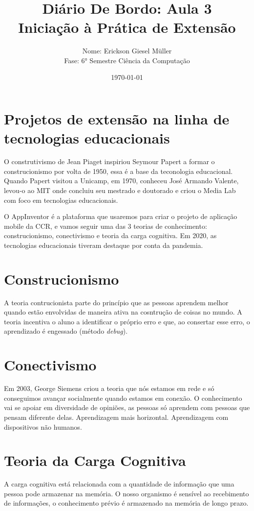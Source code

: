 \documentclass[12pt, a4paper]{article}
\title{Diário De Bordo: Aula 3\\Iniciação à Prática de Extensão}
\author{Nome: Erickson Giesel Müller
\\ Fase: 6° Semestre Ciência da Computação}
\date{\today}
\begin{document}
\maketitle
\thispagestyle{empty} %

\section*{Projetos de extensão na linha de tecnologias educacionais}
O construtivismo de Jean Piaget inspiriou Seymour Papert a formar o construcionismo por volta de 1950, essa é a base da teconologia educacional. Quando Papert visitou a Unicamp, em 1970, conheceu José Armando Valente, levou-o ao MIT onde concluiu seu mestrado e doutorado e criou o Media Lab com foco em tecnologias educacionais.

O AppInventor é a plataforma que usaremos para criar o projeto de aplicação mobile da CCR, e vamos seguir uma das 3 teorias de conhecimento: construcionismo, conectivismo e teoria da carga cognitiva. Em 2020, as tecnologias educacionais tiveram destaque por conta da pandemia.

\section*{Construcionismo}
A teoria contrucionista parte do princípio que as pessoas aprendem melhor quando estão envolvidas de maneira ativa na cosntrução de coisas no mundo. A teoria incentiva o aluno a identificar o próprio erro e que, ao consertar esse erro, o aprendizado é engessado (método \textit{debug}).

\section*{Conectivismo}
Em 2003, George Siemens criou a teoria que nós estamos em rede e só conseguimos avançar socialmente quando estamos em conexão. O conhecimento vai se apoiar em diversidade de opiniões, as pessoas só aprendem com pessoas que pensam diferente delas. Aprendizagem mais horizontal. Aprendizagem com dispositivos não humanos.

\section*{Teoria da Carga Cognitiva}
A carga cognitiva está relacionada com a quantidade de informação que uma pessoa pode armazenar na memória. O nosso organismo é sensível ao recebimento de informações, o conhecimento prévio é armazenado na memória de longo prazo.
\end{document}

